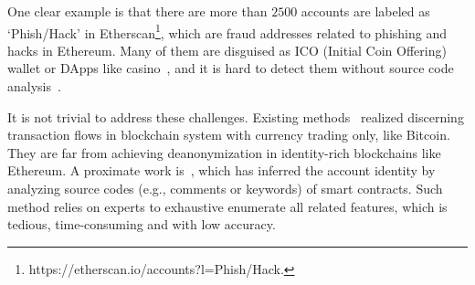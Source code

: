 One clear example is that there are more than $2500$ accounts are labeled as `Phish/Hack' in Etherscan\footnote{https://etherscan.io/accounts?l=Phish/Hack.}, which are fraud addresses related to phishing and hacks in Ethereum. Many of them are disguised as ICO (Initial Coin Offering) wallet or DApps like casino~\cite{cerchiello2018icos}, and it is hard to detect them without source code analysis~\cite{jiang2018contractfuzzer}. 

It is not trivial to address these challenges. Existing methods~\cite{maesa2016analysis,ranshous2017exchange,zhao2015graph} realized discerning transaction flows in blockchain system with currency trading only, like Bitcoin. They are far from achieving deanonymization in identity-rich blockchains like Ethereum. A proximate work is~\cite{chen2018infocom}, which has inferred the account identity by analyzing source codes (e.g., comments or keywords) of smart contracts. Such method relies on experts to exhaustive enumerate all related features, which is tedious, time-consuming and with low accuracy.





